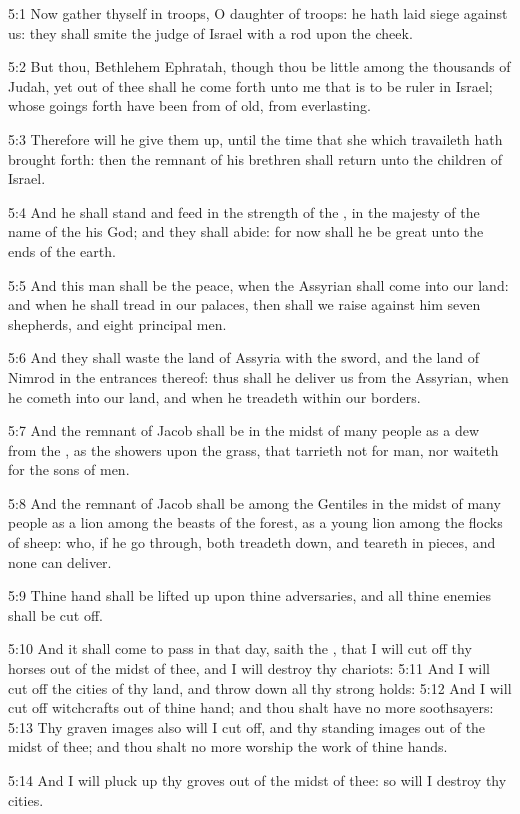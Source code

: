 5:1 Now gather thyself in troops, O daughter of troops: he hath laid
siege against us: they shall smite the judge of Israel with a rod upon
the cheek.

5:2 But thou, Bethlehem Ephratah, though thou be little among the
thousands of Judah, yet out of thee shall he come forth unto me that
is to be ruler in Israel; whose goings forth have been from of old,
from everlasting.

5:3 Therefore will he give them up, until the time that she which
travaileth hath brought forth: then the remnant of his brethren shall
return unto the children of Israel.

5:4 And he shall stand and feed in the strength of the \LORD, in the
majesty of the name of the \LORD his God; and they shall abide: for now
shall he be great unto the ends of the earth.

5:5 And this man shall be the peace, when the Assyrian shall come into
our land: and when he shall tread in our palaces, then shall we raise
against him seven shepherds, and eight principal men.

5:6 And they shall waste the land of Assyria with the sword, and the
land of Nimrod in the entrances thereof: thus shall he deliver us from
the Assyrian, when he cometh into our land, and when he treadeth
within our borders.

5:7 And the remnant of Jacob shall be in the midst of many people as a
dew from the \LORD, as the showers upon the grass, that tarrieth not
for man, nor waiteth for the sons of men.

5:8 And the remnant of Jacob shall be among the Gentiles in the midst
of many people as a lion among the beasts of the forest, as a young
lion among the flocks of sheep: who, if he go through, both treadeth
down, and teareth in pieces, and none can deliver.

5:9 Thine hand shall be lifted up upon thine adversaries, and all
thine enemies shall be cut off.

5:10 And it shall come to pass in that day, saith the \LORD, that I
will cut off thy horses out of the midst of thee, and I will destroy
thy chariots: 5:11 And I will cut off the cities of thy land, and
throw down all thy strong holds: 5:12 And I will cut off witchcrafts
out of thine hand; and thou shalt have no more soothsayers: 5:13 Thy
graven images also will I cut off, and thy standing images out of the
midst of thee; and thou shalt no more worship the work of thine hands.

5:14 And I will pluck up thy groves out of the midst of thee: so will
I destroy thy cities.

